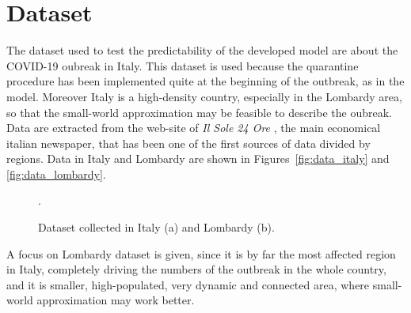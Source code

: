 \section{Dataset}
\label{sec:data}

The dataset used to test the predictability of the developed model are about the COVID-19 oubreak in Italy. This dataset is used because the quarantine procedure has been implemented quite at the beginning of the outbreak, as in the model. Moreover Italy is a high-density country, especially in the Lombardy area, so that the small-world approximation may be feasible to describe the oubreak. Data are extracted from the web-site of \emph{Il Sole 24 Ore} \cite{Lab24}, the main economical italian newspaper, that has been one of the first sources of data divided by regions. Data in Italy and Lombardy are shown in Figures~\ref{fig:data_italy} and \ref{fig:data_lombardy}.\\

\begin{figure}[!ht]\centering
{}

\caption{Dataset collected in Italy (a) and Lombardy (b).}.
\end{figure}

A focus on Lombardy dataset is given, since it is by far the most affected region in Italy, completely driving the numbers of the outbreak in the whole country, and it is smaller, high-populated, very dynamic and connected area, where small-world approximation may work better.